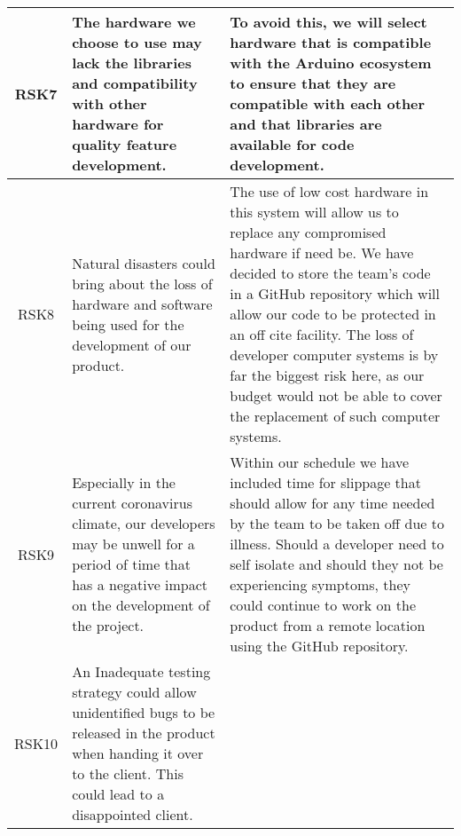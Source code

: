 \begin{xltabular}[H]{\textwidth}{c | X | X}
    \midrule

    RSK7

    &

    The hardware we choose to use may lack the libraries and compatibility with other hardware for quality feature development.

    &

    To avoid this, we will select hardware that is compatible with the Arduino ecosystem to ensure that they are compatible with each other and that libraries are available for code development.\\

    \midrule

    RSK8

    &

    Natural disasters could bring about the loss of hardware and software being used for the development of our product.

    &

    The use of low cost hardware in this system will allow us to replace any compromised hardware if need be. We have decided to store the team's code in a GitHub repository which will allow our code to be protected in an off cite facility. The loss of developer computer systems is by far the biggest risk here, as our budget would not be able to cover the replacement of such computer systems.\\

    \midrule

    RSK9

    &

    Especially in the current coronavirus climate, our developers may be unwell for a period of time that has a negative impact on the development of the project.

    &

    Within our schedule we have included time for slippage that should allow for any time needed by the team to be taken off due to illness. Should a developer need to self isolate and should they not be experiencing symptoms, they could continue to work on the product from a remote location using the GitHub repository.\\

    \midrule

    RSK10

    &

    An Inadequate testing strategy could allow unidentified bugs to be released in the product when handing it over to the client. This could lead to a disappointed client.


\end{xltabular}
